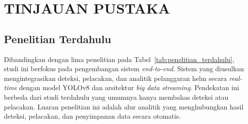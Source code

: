 
\chapter{TINJAUAN PUSTAKA}

\section{Penelitian Terdahulu}
Dibandingkan dengan lima penelitian pada Tabel~\ref{tab:penelitian_terdahulu},
studi ini berfokus pada pengembangan sistem \textit{end-to-end}. Sistem yang diusulkan
mengintegrasikan deteksi, pelacakan, dan analitik pelanggaran helm secara
\textit{real-time} dengan model YOLOv8 dan arsitektur \textit{big data streaming}.
Pendekatan ini berbeda dari studi terdahulu yang umumnya hanya membahas deteksi
atau pelacakan. Luaran penelitian ini adalah alur analitik yang menghubungkan hasil deteksi,
pelacakan, dan penyimpanan data secara otomatis.

\vspace{0.5\baselineskip}

